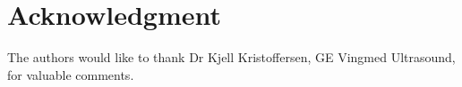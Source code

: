 \documentclass[journal]{IEEEtran}
\begin{document}






%





\section*{Acknowledgment}
The authors would like to thank Dr Kjell Kristoffersen, GE Vingmed Ultrasound, for valuable comments. 
\end{document}
